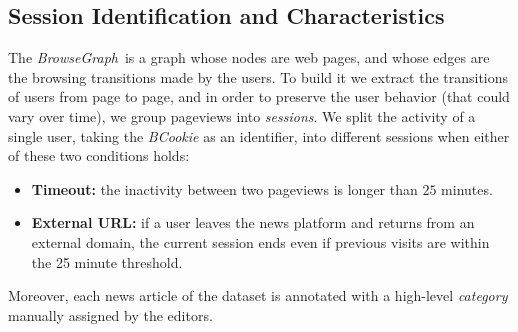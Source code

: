 \documentclass{sig-alternate-2013}
\newcommand{\bgraph}{\textit{BrowseGraph}}
\begin{document}
\subsection{Session Identification and Characteristics} \label{sec:sessions}
The \bgraph\ is a graph whose nodes are web pages, and whose edges are the
browsing transitions made by the users. To build it we extract the
transitions of users from page to page, and in order to preserve the user
behavior (that could vary over time), we group pageviews into \emph{sessions}.
We split the activity of a single user, taking the \textit{BCookie} as an
identifier, into different sessions when either of these two conditions holds:
\begin{itemize}
  \item {\bf Timeout:} the inactivity between two pageviews is longer than $25$ minutes.
  \item {\bf External URL:} if a user leaves the news platform and returns from an external domain, the current session ends even if previous visits are within the 25 minute threshold.
\end{itemize}
%
Moreover, each news article of the dataset is annotated with a high-level {\it category} manually assigned by the editors.

\end{document}
